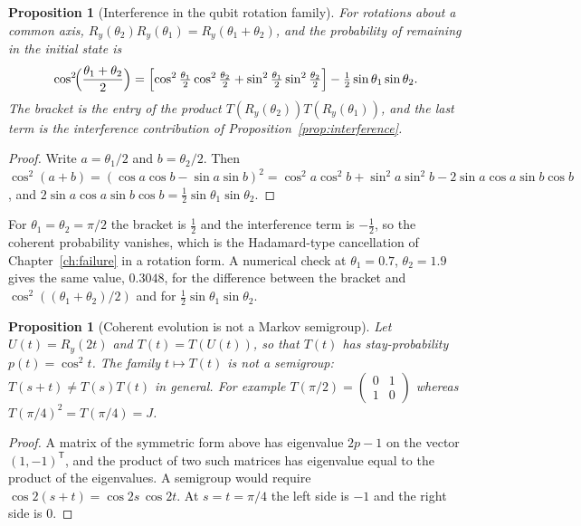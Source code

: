\documentclass[11pt,oneside]{book}
\newtheorem{proposition}[theorem]{Proposition}
\theoremstyle{definition}
\theoremstyle{remark}
\begin{document}
\begin{proposition}[Interference in the qubit rotation family]\label{prop:qubit-interference}
For rotations about a common axis, $R_y(\theta_2)R_y(\theta_1)=R_y(\theta_1+\theta_2)$, and the probability of remaining in the initial state is
\[
\cos^2\!\Bigl(\frac{\theta_1+\theta_2}{2}\Bigr)=\Bigl[\cos^2\tfrac{\theta_1}2\cos^2\tfrac{\theta_2}2+\sin^2\tfrac{\theta_1}2\sin^2\tfrac{\theta_2}2\Bigr]-\tfrac12\sin\theta_1\sin\theta_2 .
\]
The bracket is the entry of the product $T(R_y(\theta_2))T(R_y(\theta_1))$, and the last term is the interference contribution of Proposition~\ref{prop:interference}.
\end{proposition}

\begin{proof}
Write $a=\theta_1/2$ and $b=\theta_2/2$. Then $\cos^2(a+b)=(\cos a\cos b-\sin a\sin b)^2=\cos^2a\cos^2b+\sin^2a\sin^2b-2\sin a\cos a\sin b\cos b$, and $2\sin a\cos a\sin b\cos b=\tfrac12\sin\theta_1\sin\theta_2$.
\end{proof}

For $\theta_1=\theta_2=\pi/2$ the bracket is $\tfrac12$ and the interference term is $-\tfrac12$, so the coherent probability vanishes, which is the Hadamard-type cancellation of Chapter~\ref{ch:failure} in a rotation form. A numerical check at $\theta_1=0.7$, $\theta_2=1.9$ gives the same value, $0.3048$, for the difference between the bracket and $\cos^2((\theta_1+\theta_2)/2)$ and for $\tfrac12\sin\theta_1\sin\theta_2$.

\begin{proposition}[Coherent evolution is not a Markov semigroup]\label{prop:semigroup}
Let $U(t)=R_y(2t)$ and $T(t)=T(U(t))$, so that $T(t)$ has stay-probability $p(t)=\cos^2t$. The family $t\mapsto T(t)$ is not a semigroup: $T(s+t)\neq T(s)T(t)$ in general. For example $T(\pi/2)=\begin{pmatrix}0&1\\1&0\end{pmatrix}$ whereas $T(\pi/4)^2=T(\pi/4)=J$.
\end{proposition}

\begin{proof}
A matrix of the symmetric form above has eigenvalue $2p-1$ on the vector $(1,-1)^{\mathsf T}$, and the product of two such matrices has eigenvalue equal to the product of the eigenvalues. A semigroup would require $\cos2(s+t)=\cos2s\,\cos2t$. At $s=t=\pi/4$ the left side is $-1$ and the right side is $0$.
\end{proof}
\end{document}
